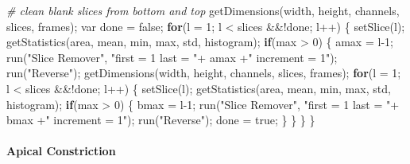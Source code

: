 \documentclass[10pt, b5paper, singlespacinge, twoside]{reedthesis} %
\newenvironment{Shaded}{}{}
\newcommand{\AttributeTok}[1]{#1}
\newcommand{\CommentTok}[1]{\textit{#1}}
\newcommand{\ControlFlowTok}[1]{\textbf{#1}}
\newcommand{\DecValTok}[1]{#1}
\newcommand{\FunctionTok}[1]{#1}
\newcommand{\NormalTok}[1]{#1}
\newcommand{\OtherTok}[1]{#1}
\newcommand{\SpecialCharTok}[1]{#1}
\newcommand{\StringTok}[1]{#1}
\theoremstyle{definition}
\theoremstyle{definition}
\theoremstyle{definition}
\theoremstyle{remark}
\begin{document}
\begin{Shaded}
\begin{Highlighting}[numbers=left,,]
\CommentTok{\# clean blank slices from bottom and top}
    \FunctionTok{getDimensions}\NormalTok{(width, height, channels, slices, frames);}
\NormalTok{    var done }\OtherTok{=}\NormalTok{ false; }
    \ControlFlowTok{for}\NormalTok{(}\AttributeTok{l =} \DecValTok{1}\NormalTok{; l }\SpecialCharTok{\textless{}}\NormalTok{ slices }\SpecialCharTok{\&\&!}\NormalTok{done; l}\SpecialCharTok{++}\NormalTok{) \{}
        \FunctionTok{setSlice}\NormalTok{(l);}
        \FunctionTok{getStatistics}\NormalTok{(area, mean, min, max, std, histogram);}
        \ControlFlowTok{if}\NormalTok{(max }\SpecialCharTok{\textgreater{}} \DecValTok{0}\NormalTok{) \{}
\NormalTok{        amax }\OtherTok{=}\NormalTok{ l}\DecValTok{{-}1}\NormalTok{;}
            \FunctionTok{run}\NormalTok{(}\StringTok{"Slice Remover"}\NormalTok{, }\StringTok{"first = 1 last = "}\SpecialCharTok{+}\NormalTok{ amax }\SpecialCharTok{+}\StringTok{" increment = 1"}\NormalTok{);}
            \FunctionTok{run}\NormalTok{(}\StringTok{"Reverse"}\NormalTok{);}
            \FunctionTok{getDimensions}\NormalTok{(width, height, channels, slices, frames);}
            \ControlFlowTok{for}\NormalTok{(}\AttributeTok{l =} \DecValTok{1}\NormalTok{; l }\SpecialCharTok{\textless{}}\NormalTok{ slices }\SpecialCharTok{\&\&!}\NormalTok{done; l}\SpecialCharTok{++}\NormalTok{) \{}
                \FunctionTok{setSlice}\NormalTok{(l);}
                \FunctionTok{getStatistics}\NormalTok{(area, mean, min, max, std, histogram);}
                \ControlFlowTok{if}\NormalTok{(max }\SpecialCharTok{\textgreater{}} \DecValTok{0}\NormalTok{) \{}
\NormalTok{                bmax }\OtherTok{=}\NormalTok{ l}\DecValTok{{-}1}\NormalTok{;}
                    \FunctionTok{run}\NormalTok{(}\StringTok{"Slice Remover"}\NormalTok{, }\StringTok{"first = 1 last = "}\SpecialCharTok{+}\NormalTok{ bmax }\SpecialCharTok{+}\StringTok{" increment = 1"}\NormalTok{);}
                    \FunctionTok{run}\NormalTok{(}\StringTok{"Reverse"}\NormalTok{);}
\NormalTok{                    done }\OtherTok{=}\NormalTok{ true;}
\NormalTok{                    \}}
\NormalTok{            \}}
\NormalTok{        \}}
\NormalTok{    \}}
\end{Highlighting}
\end{Shaded}
\normalsize

\hypertarget{apical-constriction-1}{%
\paragraph{Apical Constriction}\label{apical-constriction-1}}
\end{document}
